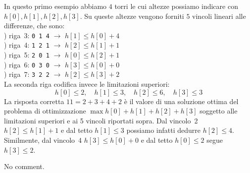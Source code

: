 \vspace{0.5cm}

In questo primo esempio abbiamo $4$ torri le cui altezze possiamo indicare con $h[0], h[1], h[2], h[3]$. Su queste altezze vengono forniti $5$ vincoli lineari alle differenze, che sono:\\
) riga~3: {\tt 0 1 4} $\rightarrow$ $h[1] \leq h[0] + 4$\\ 
) riga~4: {\tt 1 2 1} $\rightarrow$ $h[2] \leq h[1] + 1$\\
) riga~5: {\tt 2 0 1} $\rightarrow$ $h[0] \leq h[2] + 1$\\
) riga~6: {\tt 0 3 0} $\rightarrow$ $h[3] \leq h[0] + 0$\\
) riga~7: {\tt 3 2 2} $\rightarrow$ $h[2] \leq h[3] + 2$\\
La seconda riga codifica invece le limitazioni superiori:
\[
h[0] \leq 2, \quad h[1] \leq 3, \quad h[2] \leq 6, \quad h[3] \leq 3
\]
La risposta corretta $11 = 2+3+4+2$ è il valore di una soluzione ottima del problema di ottimizzazione $\max h[0]+h[1]+h[2]+h[3]$ soggetto alle limitazioni superiori e ai 5 vincoli riportati sopra. Dal vincolo~2 $h[2] \leq h[1] + 1$ e dal tetto $h[1] \leq 3$ possiamo infatti dedurre $h[2] \leq 4$.
Similmente, dal vincolo~4 $h[3] \leq h[0] + 0$ e dal tetto $h[0] \leq 2$ segue $h[3] \leq 2$.



\vspace{0.5cm}

No comment.



\vspace{0.5cm}

